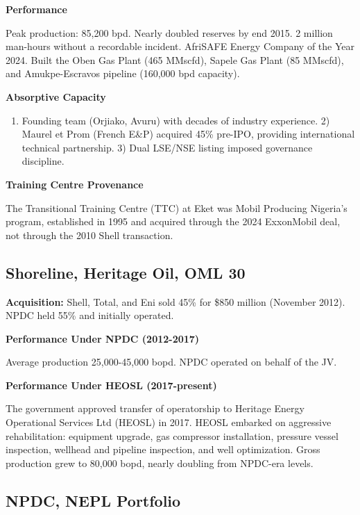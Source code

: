 \documentclass[twoside,fontset=lmodern]{mitthesis}
\providecommand{\tightlist}{\setlength{\itemsep}{0pt}\setlength{\parskip}{0pt}}
\begin{document}
\textbf{Performance}

Peak production: 85,200 bpd. Nearly doubled reserves by end 2015. 2
million man-hours without a recordable incident. AfriSAFE Energy Company
of the Year 2024. Built the Oben Gas Plant (465 MMscfd), Sapele Gas
Plant (85 MMscfd), and Amukpe-Escravos pipeline (160,000 bpd capacity).

\textbf{Absorptive Capacity}

\begin{enumerate}
\def\labelenumi{\arabic{enumi})}
\tightlist
\item
  Founding team (Orjiako, Avuru) with decades of industry experience. 2)
  Maurel et Prom (French E\&P) acquired 45\% pre-IPO, providing
  international technical partnership. 3) Dual LSE/NSE listing imposed
  governance discipline.
\end{enumerate}

\textbf{Training Centre Provenance}

The Transitional Training Centre (TTC) at Eket was Mobil Producing
Nigeria's program, established in 1995 and acquired through the 2024
ExxonMobil deal, not through the 2010 Shell transaction.

\hypertarget{shoreline-heritage-oil-oml-30}{%
\subsection{Shoreline, Heritage Oil, OML
30}\label{shoreline-heritage-oil-oml-30}}

\textbf{Acquisition:} Shell, Total, and Eni sold 45\% for \$850 million
(November 2012). NPDC held 55\% and initially operated.

\textbf{Performance Under NPDC (2012-2017)}

Average production 25,000-45,000 bopd. NPDC operated on behalf of the
JV.

\textbf{Performance Under HEOSL (2017-present)}

The government approved transfer of operatorship to Heritage Energy
Operational Services Ltd (HEOSL) in 2017. HEOSL embarked on aggressive
rehabilitation: equipment upgrade, gas compressor installation, pressure
vessel inspection, wellhead and pipeline inspection, and well
optimization. Gross production grew to 80,000 bopd, nearly doubling from
NPDC-era levels.

\hypertarget{npdc-nepl-portfolio}{%
\subsection{NPDC, NEPL Portfolio}\label{npdc-nepl-portfolio}}
\end{document}
